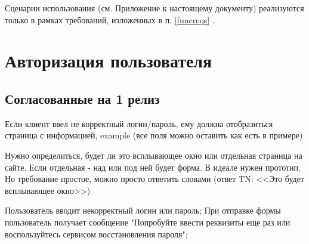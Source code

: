 Сценарии использования (см. Приложение  к настоящему документу) реализуются только в рамках требований, изложенных в п. \ref{funcreqs} .

\section{Авторизация пользователя}
\ifcand
\subsection{Согласованные на 1 релиз}
\fi

{


\begin{wiki}
Если клиент ввел не корректный логин/пароль, ему должна отобразиться страница с информацией, example (все поля можно  оставить как есть в примере)
\end{wiki}

\begin{teamidea}
Нужно определиться, будет ли это всплывающее окно или отдельная страница на сайте. Если отдельная - над или под ней будет форма.  В идеале нужен прототип. Но требование простое, можно просто ответить словами (ответ TN: <<Это будет всплывающее окно>>)
\end{teamidea}




\begin{itogo}
Пользователь вводит некорректный логин или пароль; При отправке формы пользователь получает сообщение "Попробуйте ввести реквизиты еще раз или воспользуйтесь сервисом восстановления пароля";
\end{itogo}



}


